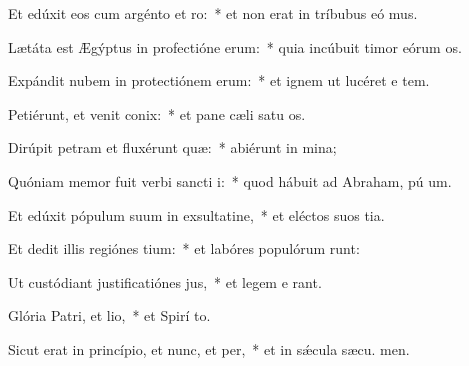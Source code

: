 \item Et edúxit eos cum argénto et ro:~* et non erat in tríbubus eó mus.
\item Lætáta est Ægýptus in profectióne erum:~* quia incúbuit timor eórum  os.
\item Expándit nubem in protectiónem erum:~* et ignem ut lucéret e  tem.
\item Petiérunt, et venit conix:~* et pane cæli satu os.
\item Dirúpit petram et fluxérunt quæ:~* abiérunt in  mina;
\item Quóniam memor fuit verbi sancti i:~* quod hábuit ad Abraham, pú um.
\item Et edúxit pópulum suum in exsultatine,~* et eléctos suos  tia.
\item Et dedit illis regiónes tium:~* et labóres populórum runt:
\item Ut custódiant justificatiónes jus,~* et legem e rant.
\item Glória Patri, et lio,~* et Spirí to.
\item Sicut erat in princípio, et nunc, et per,~* et in sǽcula sæcu. men.
